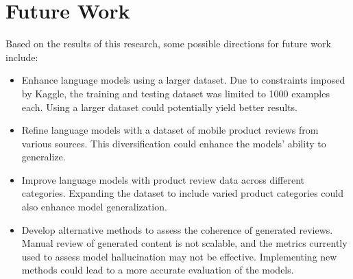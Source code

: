 \section{Future Work}
Based on the results of this research, some possible directions for future work include:
\begin{itemize}
    \item Enhance language models using a larger dataset. Due to constraints imposed by Kaggle, the training and testing dataset was limited to 1000 examples each. Using a larger dataset could potentially yield better results.
    \item Refine language models with a dataset of mobile product reviews from various sources. This diversification could enhance the models' ability to generalize.
    \item Improve language models with product review data across different categories. Expanding the dataset to include varied product categories could also enhance model generalization.
    \item Develop alternative methods to assess the coherence of generated reviews. Manual review of generated content is not scalable, and the metrics currently used to assess model hallucination may not be effective. Implementing new methods could lead to a more accurate evaluation of the models.
\end{itemize}
